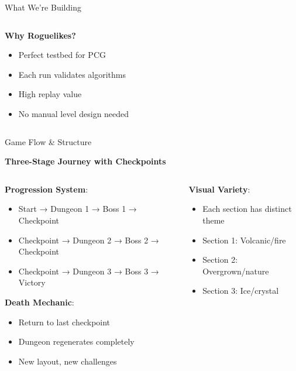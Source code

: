 \documentclass{beamer}
\begin{document}
\begin{frame}{What We're Building}
\begin{columns}[T]
\begin{column}{0.48\textwidth}
            \vspace{0.3cm}
            \textbf{Why Roguelikes?}
            \begin{itemize}
                \item Perfect testbed for PCG
                \item Each run validates algorithms
                \item High replay value
                \item No manual level design needed
            \end{itemize}
        \end{column}
    \end{columns}
\end{frame}

\begin{frame}{Game Flow \& Structure}
    \begin{center}
        \textbf{Three-Stage Journey with Checkpoints}
    \end{center}

    \begin{columns}[T]
        \begin{column}{0.48\textwidth}
            \textbf{Progression System}:
            \begin{itemize}
                \item Start → Dungeon 1 → Boss 1 → Checkpoint
                \item Checkpoint → Dungeon 2 → Boss 2 → Checkpoint
                \item Checkpoint → Dungeon 3 → Boss 3 → Victory
            \end{itemize}

            \vspace{0.3cm}
            \textbf{Death Mechanic}:
            \begin{itemize}
                \item Return to last checkpoint
                \item \textcolor{ubburgundy}{Dungeon regenerates completely}
                \item New layout, new challenges
            \end{itemize}
        \end{column}

        \begin{column}{0.48\textwidth}
            \textbf{Visual Variety}:
            \begin{itemize}
                \item Each section has distinct theme
                \item Section 1: Volcanic/fire
                \item Section 2: Overgrown/nature
                \item Section 3: Ice/crystal
            \end{itemize}


\end{column}
\end{columns}
\end{frame}
\end{document}
